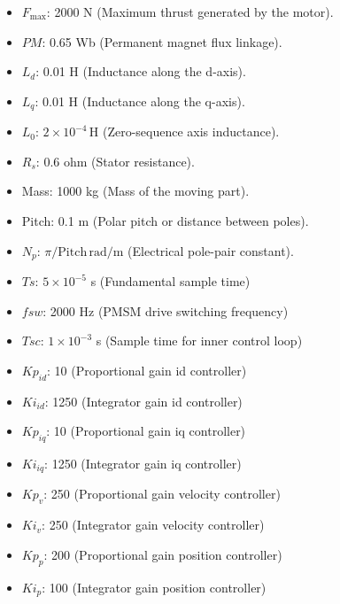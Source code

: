 \documentclass{article}
\begin{document}
    \begin{itemize}
        \item $F_{\text{max}}$: 2000 N (Maximum thrust generated by the motor).

        \item $PM$: 0.65 Wb (Permanent magnet flux linkage).

        \item $L_{d}$: 0.01 H (Inductance along the d-axis).

        \item $L_{q}$: 0.01 H (Inductance along the q-axis).

        \item $L_{0}$: $2 \times 10^{-4}\, \text{H}$ (Zero-sequence axis inductance).

        \item $R_{s}$: 0.6 ohm (Stator resistance).

        \item Mass: 1000 kg (Mass of the moving part).

        \item Pitch: 0.1 m (Polar pitch or distance between poles).

        \item $N_{p}$: $\pi/\text{Pitch}\, \text{rad/m}$ (Electrical pole-pair constant).

        \item $Ts$: $5 \times 10^{-5}$ s (Fundamental sample time)

        \item $fsw$: 2000 Hz (PMSM drive switching frequency)

        \item $Tsc$: $1 \times 10^{-3}$ s (Sample time for inner control loop)

        \item $Kp_{id}$: 10 (Proportional gain id controller)

        \item $Ki_{id}$: 1250 (Integrator gain id controller)

        \item $Kp_{iq}$: 10 (Proportional gain iq controller)

        \item $Ki_{iq}$: 1250 (Integrator gain iq controller)

        \item $Kp_{v}$: 250 (Proportional gain velocity controller)

        \item $Ki_{v}$: 250 (Integrator gain velocity controller)

        \item $Kp_{p}$: 200 (Proportional gain position controller)

        \item $Ki_{p}$: 100 (Integrator gain position controller)
    \end{itemize}
\end{document}
